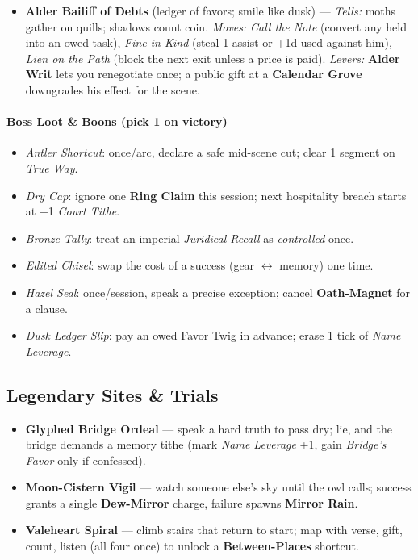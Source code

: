 \begin{itemize}
  \item \textbf{Alder Bailiff of Debts} (ledger of favors; smile like dusk) --- \emph{Tells:} moths gather on quills; shadows count coin. \emph{Moves:} \emph{Call the Note} (convert any \Diamond{} held into an owed task), \emph{Fine in Kind} (steal 1 assist or +1d used against him), \emph{Lien on the Path} (block the next exit unless a price is paid). \emph{Levers:} \textbf{Alder Writ} lets you renegotiate once; a public gift at a \textbf{Calendar Grove} downgrades his effect for the scene.
\end{itemize}

\paragraph*{Boss Loot \& Boons (pick 1 on victory)}
\begin{itemize}
  \item \emph{Antler Shortcut}: once/arc, declare a safe mid-scene cut; clear 1 segment on \emph{True Way}.
  \item \emph{Dry Cap}: ignore one \textbf{Ring Claim} this session; next hospitality breach starts at +1 \emph{Court Tithe}.
  \item \emph{Bronze Tally}: treat an imperial \emph{Juridical Recall} as \emph{controlled} once.
  \item \emph{Edited Chisel}: swap the cost of a success (gear $\leftrightarrow$ memory) one time.
  \item \emph{Hazel Seal}: once/session, speak a precise exception; cancel \textbf{Oath-Magnet} for a clause.
  \item \emph{Dusk Ledger Slip}: pay an owed Favor Twig in advance; erase 1 tick of \emph{Name Leverage}.
\end{itemize}

\subsection*{Legendary Sites \& Trials}
\begin{itemize}
  \item \textbf{Glyphed Bridge Ordeal} --- speak a hard truth to pass dry; lie, and the bridge demands a memory tithe (mark \emph{Name Leverage} +1, gain \emph{Bridge’s Favor} only if confessed).
  \item \textbf{Moon-Cistern Vigil} --- watch someone else’s sky until the owl calls; success grants a single \textbf{Dew-Mirror} charge, failure spawns \textbf{Mirror Rain}.
  \item \textbf{Valeheart Spiral} --- climb stairs that return to start; map with verse, gift, count, listen (all four once) to unlock a \textbf{Between-Places} shortcut.
\end{itemize}

